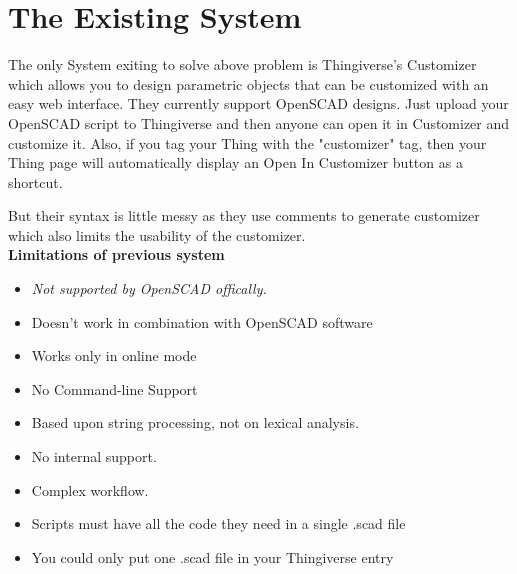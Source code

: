 \section{The Existing System}
The only System exiting to solve above problem is Thingiverse's Customizer which allows you to design parametric objects that can be customized with an easy web interface. They currently support OpenSCAD designs. Just upload your OpenSCAD script to Thingiverse and then anyone can open it in Customizer and customize it. Also, if you tag your Thing with the "customizer" tag, then your Thing page will automatically display an Open In Customizer button as a shortcut.

But their syntax is little messy as they use comments to generate customizer which also limits the usability of the customizer. \\

{\bf {Limitations of previous system }}
\begin{itemize}
	\item \emph{Not supported by OpenSCAD offically.}
	
	\item Doesn't work in combination with OpenSCAD software
	
	\item Works only in online mode
	
	\item No Command-line Support
	
	\item Based upon string processing, not on lexical analysis.
	
	\item No internal support.
	
	\item Complex workflow.
	
	\item Scripts must have all the code they need in a single .scad file
	
	\item You could only put one .scad file in your Thingiverse entry
\end{itemize}